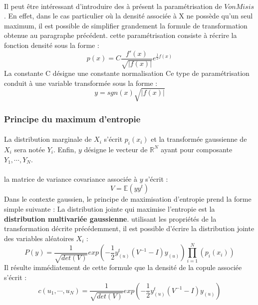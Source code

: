 \documentclass{article}
\begin{document}
 \paragraph{}
 Il peut être intéressant d'introduire des à présent la paramétrisation de $Von Misis$ . En effet, dans le cas particulier où la densité associée à X ne possède qu'un seul maximum, il est possible de simplifier grandement la formule de transformation obtenue au paragraphe précédent. cette paramétrisation consiste à récrire la fonction densité sous la forme : 
 \begin{equation}
 p(x)=C\frac{f'(x)}{\sqrt{\vert f(x)\vert }}e^{\frac{1}{2}f(x)}
 \end{equation}
 La constante C désigne une constante normalisation
 Ce type de paramétrisation conduit à une variable transformée sous la forme :
 \begin{equation}
 y=sgn(x)\sqrt{\vert f(x)\vert}
 \end{equation}
  \subsubsection{Principe du maximum d'entropie}
  \paragraph{} 
  La distribution marginale de $X_{i}$ s'écrit $p_{i}(x_{i})$ et la transformée gaussienne de $X_{i}$ sera notée $Y_{i}$. Enfin, $y$ désigne le vecteur de $\mathbb{R}^{N}$ ayant pour composante $Y_{1},\cdots ,Y_{N}$.
  \paragraph{}
   la matrice de variance covariance associée à $y$ s'écrit :
  \begin{equation}
  V=\mathbb{E}(yy^{t})
  \end{equation}
   Dans le contexte gaussien, le principe de maximisation d'entropie prend la forme simple suivante :
   La distribution jointe qui maximise l'entropie est la \textbf{distribution multivariée gaussienne}.  utilisant les propriétés de la transformation décrite précédemment, il est possible d'écrire la distribution jointe des variables aléatoires $X_{i}$ :
   \begin{equation}
   P(y)=\frac{1}{\sqrt{det(V)}}exp(-\frac{1}{2}y^{t}_{(u)}(V^{-1}-I)y_{(u)})\prod_{i=1}^{N}(p_{i}(x_{i}))
   \end{equation}
   Il résulte immédiatement de cette formule que la densité de la copule associée s'écrit :
   \begin{equation}
   c(u_{1},\cdots ,u_{N})=\frac{1}{\sqrt{det(V)}}exp(-\frac{1}{2}y^{t}_{(u)}(V^{-1}-I)y_{(u)})
   \end{equation}
\end{document}
